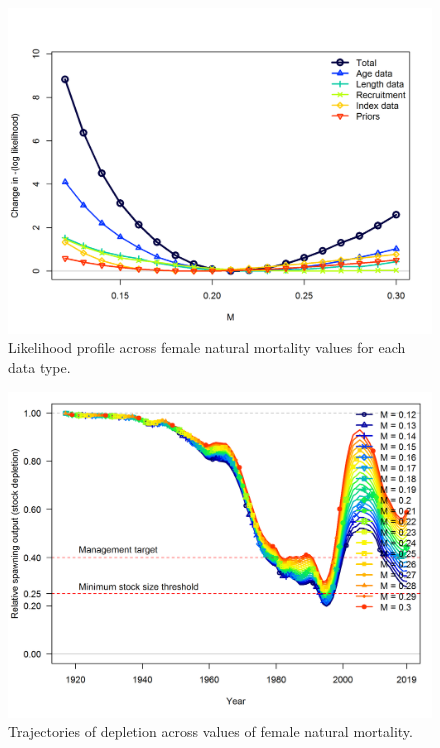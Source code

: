 \documentclass[12pt,]{article}
\begin{document}
\FloatBarrier

\begin{figure}
\centering
\includegraphics{Figures/profile_m_like.png}
\caption{Likelihood profile across female natural mortality values for
each data type. \label{fig:profile_m_like}}
\end{figure}

\FloatBarrier

\begin{figure}
\centering
\includegraphics{Figures/profile_m_depl.png}
\caption{Trajectories of depletion across values of female natural
mortality. \label{fig:profile_m_depl}}
\end{figure}
\end{document}
